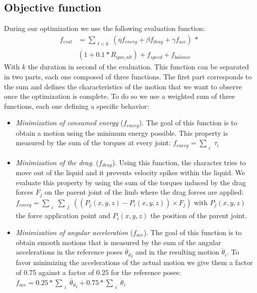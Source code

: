 \documentclass[conference]{acmsiggraph}
\begin{document}
\subsection{Objective function}
During our optimization we use the following evaluation function:
\begin{equation}
\begin{split}
f_{eval} &=\sum_{\substack{t<k}} (\eta f_{energ} + \beta f_{drag} + \gamma f_{acc})\, *\\&(1+0.1* R_{ipm\_alt}) 
+ f_{speed} + f_{balance}
\label{eq:complete_eval}
\end{split}
\end{equation}
With $k$ the duration in second of the evaluation. This function can be separated in two parts, each one composed of three functions. The first part corresponds to the sum and defines the characteristics of the motion that we want to observe once the optimization is complete. To do so we use a weighted sum of three functions, each one defining a specific behavior:
\begin{itemize}
\item{\textit{Minimization of consumed energy} ($f_{energ}$). The goal of this function is to obtain a motion using the minimum energy possible. This property is measured by the sum of the torques at every joint: $f_{energ}=\sum_{\substack{i}}{\tau_i}$} 
\item{\textit{Minimization of the drag}. ($f_{drag}$). Using this function, the character tries to move out of the liquid and it prevents velocity spikes within the liquid. We evaluate this property by using the sum of the torques induced by the drag forces $F_j$ on the parent joint of the limb where the drag forces are applied: $f_{energ}=\sum_{\substack{i}}\sum_{\substack{j}}((P_j(x,y,z)-P_i(x,y,z)) \times F_j)$ with  $P_j(x,y,z)$ the force application point and $P_i(x,y,z)$ the position of the parent joint.}
\item{\textit{Minimization of angular acceleration} ($f_{acc}$). The goal of this function is to obtain smooth motions that is measured by the sum of the angular accelerations in the reference poses $\ddot{\theta_d}_i$ and in the resulting motion $\ddot{\theta}_i$. To favor minimizing the accelerations of the actual motion we give them a factor of 0.75 against a factor of 0.25 for the reference poses: $f_{acc}=0.25*\sum_{\substack{i}}\ddot{\theta_d}_i+0.75*\sum_{\substack{i}}\ddot{\theta}_i$ }
\end{itemize}
\end{document}
